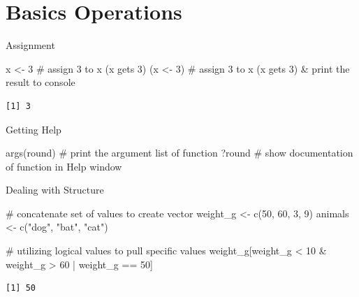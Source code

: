 \documentclass[
  letterpaper,
  DIV=11,
  numbers=noendperiod]{scrreprt}
\newenvironment{Shaded}{\begin{snugshade}}{\end{snugshade}}
\newcommand{\CommentTok}[1]{\textcolor[rgb]{0.37,0.37,0.37}{#1}}
\newcommand{\DecValTok}[1]{\textcolor[rgb]{0.68,0.00,0.00}{#1}}
\newcommand{\FunctionTok}[1]{\textcolor[rgb]{0.28,0.35,0.67}{#1}}
\newcommand{\NormalTok}[1]{\textcolor[rgb]{0.00,0.23,0.31}{#1}}
\newcommand{\OtherTok}[1]{\textcolor[rgb]{0.00,0.23,0.31}{#1}}
\newcommand{\SpecialCharTok}[1]{\textcolor[rgb]{0.37,0.37,0.37}{#1}}
\newcommand{\StringTok}[1]{\textcolor[rgb]{0.13,0.47,0.30}{#1}}
\begin{document}
\section{Basics Operations}\label{basics-operations}

Assignment

\begin{Shaded}
\begin{Highlighting}[]
\NormalTok{x }\OtherTok{\textless{}{-}} \DecValTok{3} \CommentTok{\# assign 3 to x (x gets 3)}
\NormalTok{(x }\OtherTok{\textless{}{-}} \DecValTok{3}\NormalTok{) }\CommentTok{\# assign 3 to x (x gets 3) \& print the result to console}
\end{Highlighting}
\end{Shaded}

\begin{verbatim}
[1] 3
\end{verbatim}

Getting Help

\begin{Shaded}
\begin{Highlighting}[]
\FunctionTok{args}\NormalTok{(round) }\CommentTok{\# print the argument list of function}
\NormalTok{?round }\CommentTok{\# show documentation of function in Help window}
\end{Highlighting}
\end{Shaded}

Dealing with Structure

\begin{Shaded}
\begin{Highlighting}[]
\CommentTok{\# concatenate set of values to create vector}
\NormalTok{weight\_g }\OtherTok{\textless{}{-}} \FunctionTok{c}\NormalTok{(}\DecValTok{50}\NormalTok{, }\DecValTok{60}\NormalTok{, }\DecValTok{3}\NormalTok{, }\DecValTok{9}\NormalTok{)}
\NormalTok{animals }\OtherTok{\textless{}{-}} \FunctionTok{c}\NormalTok{(}\StringTok{"dog"}\NormalTok{, }\StringTok{"bat"}\NormalTok{, }\StringTok{"cat"}\NormalTok{)}

\CommentTok{\# utilizing logical values to pull specific values}
\NormalTok{weight\_g[weight\_g }\SpecialCharTok{\textless{}} \DecValTok{10} \SpecialCharTok{\&}\NormalTok{ weight\_g }\SpecialCharTok{\textgreater{}} \DecValTok{60} \SpecialCharTok{|}\NormalTok{ weight\_g }\SpecialCharTok{==} \DecValTok{50}\NormalTok{]}
\end{Highlighting}
\end{Shaded}

\begin{verbatim}
[1] 50
\end{verbatim}
\end{document}
